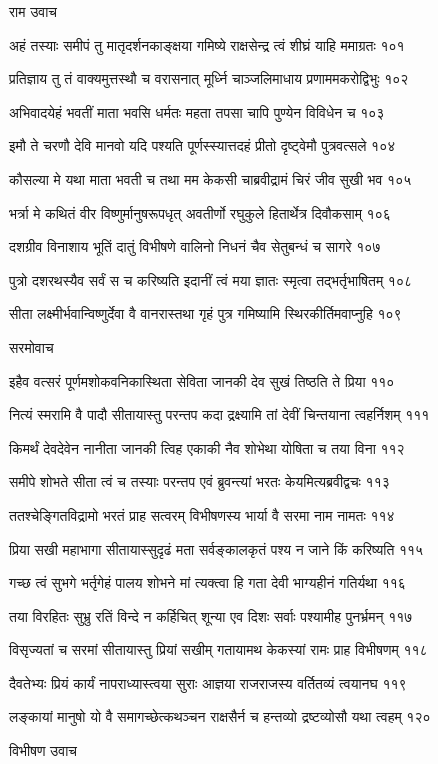 राम उवाच

अहं तस्याः समीपं तु मातृदर्शनकाङ्क्षया
गमिष्ये राक्षसेन्द्र त्वं शीघ्रं याहि ममाग्रतः १०१

प्रतिज्ञाय तु तं वाक्यमुत्तस्थौ च वरासनात्
मूर्ध्नि चाञ्जलिमाधाय प्रणाममकरोद्विभुः १०२

अभिवादयेहं भवतीं माता भवसि धर्मतः
महता तपसा चापि पुण्येन विविधेन च १०३

इमौ ते चरणौ देवि मानवो यदि पश्यति
पूर्णस्स्यात्तदहं प्रीतो दृष्ट्वेमौ पुत्रवत्सले १०४

कौसल्या मे यथा माता भवती च तथा मम
केकसी चाब्रवीद्रामं चिरं जीव सुखी भव १०५

भर्त्रा मे कथितं वीर विष्णुर्मानुषरूपधृत्
अवतीर्णो रघुकुले हितार्थेत्र दिवौकसाम् १०६

दशग्रीव विनाशाय भूतिं दातुं विभीषणे
वालिनो निधनं चैव सेतुबन्धं च सागरे १०७

पुत्रो दशरथस्यैव सर्वं स च करिष्यति
इदानीं त्वं मया ज्ञातः स्मृत्वा तद्भर्तृभाषितम् १०८

सीता लक्ष्मीर्भवान्विष्णुर्देवा वै वानरास्तथा
गृहं पुत्र गमिष्यामि स्थिरकीर्तिमवाप्नुहि १०९

सरमोवाच

इहैव वत्सरं पूर्णमशोकवनिकास्थिता
सेविता जानकी देव सुखं तिष्ठति ते प्रिया ११०

नित्यं स्मरामि वै पादौ सीतायास्तु परन्तप
कदा द्रक्ष्यामि तां देवीं चिन्तयाना त्वहर्निशम् १११

किमर्थं देवदेवेन नानीता जानकी त्विह
एकाकी नैव शोभेथा योषिता च तया विना ११२

समीपे शोभते सीता त्वं च तस्याः परन्तप
एवं ब्रुवन्त्यां भरतः केयमित्यब्रवीद्वचः ११३

ततश्चेङ्गितविद्रामो भरतं प्राह सत्वरम्
विभीषणस्य भार्या वै सरमा नाम नामतः ११४

प्रिया सखी महाभागा सीतायास्सुदृढं मता
सर्वङ्कालकृतं पश्य न जाने किं करिष्यति ११५

गच्छ त्वं सुभगे भर्तृगेहं पालय शोभने
मां त्यक्त्वा हि गता देवी भाग्यहीनं गतिर्यथा ११६

तया विरहितः सुभ्रु रतिं विन्दे न कर्हिचित्
शून्या एव दिशः सर्वाः पश्यामीह पुनर्भ्रमन् ११७

विसृज्यतां च सरमां सीतायास्तु प्रियां सखीम्
गतायामथ केकस्यां रामः प्राह विभीषणम् ११८

दैवतेभ्यः प्रियं कार्यं नापराध्यास्त्वया सुराः
आज्ञया राजराजस्य वर्तितव्यं त्वयानघ ११९

लङ्कायां मानुषो यो वै समागच्छेत्कथञ्चन
राक्षसैर्न च हन्तव्यो द्रष्टव्योसौ यथा त्वहम् १२०

विभीषण उवाच


